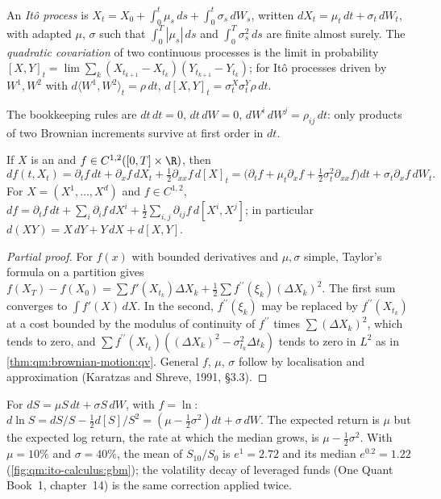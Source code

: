 \begin{definition}\label{def:qm:ito-calculus:process}
An \emph{Itô process} is $X_t = X_0 + \int_0^t\mu_s\,ds + \int_0^t\sigma_s\,dW_s$, written
$dX_t = \mu_t\,dt + \sigma_t\,dW_t$, with adapted $\mu$, $\sigma$ such that $\int_0^T|\mu_s|\,ds$ and
$\int_0^T\sigma_s^2\,ds$ are finite almost surely. The \emph{quadratic covariation} of two continuous processes is the limit in probability $[X, Y]_t =
\lim\sum_k(X_{t_{k+1}} - X_{t_k})(Y_{t_{k+1}} - Y_{t_k})$; for Itô processes driven by $W^1, W^2$
with $d\langle W^1, W^2\rangle_t = \rho\,dt$, $d[X, Y]_t = \sigma^X_t\sigma^Y_t\rho\,dt$.
\end{definition}

The bookkeeping rules are $dt\,dt = 0$, $dt\,dW = 0$, $dW^i\,dW^j = \rho_{ij}\,dt$: only products of
two Brownian increments survive at first order in $dt$.

\begin{theorem}\label{thm:qm:ito-calculus:ito}
If $X$ is an  and $f \in C^{1,2}([0,T]\times\R)$, then
\[
df(t, X_t) = \partial_tf\,dt + \partial_xf\,dX_t + \tfrac12\partial_{xx}f\,d[X]_t
= \bigl(\partial_tf + \mu_t\partial_xf + \tfrac12\sigma_t^2\partial_{xx}f\bigr)dt + \sigma_t\partial_xf\,dW_t.
\]
For $X = (X^1, \dots, X^d)$ and $f \in C^{1,2}$, $df = \partial_tf\,dt + \sum_i\partial_if\,dX^i +
\tfrac12\sum_{i,j}\partial_{ij}f\,d[X^i, X^j]$; in particular $d(XY) = X\,dY + Y\,dX + d[X, Y]$.
\end{theorem}

\begin{proof}[Partial proof]
For $f(x)$ with bounded derivatives and $\mu, \sigma$ simple, Taylor's formula on a partition gives
$f(X_T) - f(X_0) = \sum f'(X_{t_k})\Delta X_k + \tfrac12\sum f^{\prime\prime}(\xi_k)(\Delta X_k)^2$. The first sum
converges to $\int f'(X)\,dX$. In the second, $f^{\prime\prime}(\xi_k)$ may be replaced by $f^{\prime\prime}(X_{t_k})$ at a
cost bounded by the modulus of continuity of $f^{\prime\prime}$ times $\sum(\Delta X_k)^2$, which tends to zero,
and $\sum f^{\prime\prime}(X_{t_k})((\Delta X_k)^2 - \sigma_{t_k}^2\Delta t_k)$ tends to zero in $L^2$ as in
\cref{thm:qm:brownian-motion:qv}. General $f$, $\mu$, $\sigma$ follow by localisation and
approximation (Karatzas and Shreve, 1991, §3.3).
\end{proof}

\begin{example}\label{ex:qm:ito-calculus:log}
For $dS = \mu S\,dt + \sigma S\,dW$, with $f = \ln$: $d\ln S = dS/S - \tfrac12 d[S]/S^2 = (\mu -
\tfrac12\sigma^2)dt + \sigma\,dW$. The expected return is $\mu$ but the expected log return, the rate
at which the median grows, is $\mu - \tfrac12\sigma^2$. With $\mu = 10\%$ and $\sigma = 40\%$, the
mean of $S_{10}/S_0$ is $e^{1} = 2.72$ and its median $e^{0.2} = 1.22$
(\cref{fig:qm:ito-calculus:gbm}); the volatility decay of leveraged funds (One Quant Book~1,
chapter~14) is the same correction applied twice.
\end{example}

